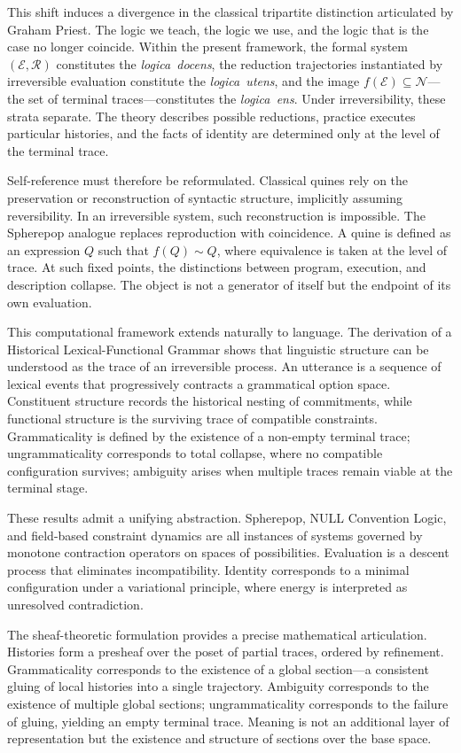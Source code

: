 \documentclass[12pt, oneside]{amsbook}
\theoremstyle{plain}
\theoremstyle{definition}
\theoremstyle{remark}
\newcommand{\Expr}{\mathcal{E}}
\newcommand{\NF}{\mathcal{N}}
\newcommand{\evalf}{f}
\newcommand{\tequiv}{\sim}
\newcommand{\ruleR}{\mathcal{R}}
\newcommand{\docens}{\textit{logica~docens}}
\newcommand{\utens}{\textit{logica~utens}}
\newcommand{\ens}{\textit{logica~ens}}
\begin{document}
This shift induces a divergence in the classical tripartite distinction
articulated by Graham Priest. The logic we teach, the logic we use, and the
logic that is the case no longer coincide. Within the present framework, the
formal system $(\Expr, \ruleR)$ constitutes the \docens{}, the reduction
trajectories instantiated by irreversible evaluation constitute the \utens{},
and the image $\evalf(\Expr) \subseteq \NF$---the set of terminal traces---constitutes
the \ens{}. Under irreversibility, these strata separate. The theory describes
possible reductions, practice executes particular histories, and the facts of
identity are determined only at the level of the terminal trace.

Self-reference must therefore be reformulated. Classical quines rely on the
preservation or reconstruction of syntactic structure, implicitly assuming
reversibility. In an irreversible system, such reconstruction is impossible.
The Spherepop analogue replaces reproduction with coincidence. A quine is
defined as an expression $Q$ such that $\evalf(Q) \tequiv Q$, where
equivalence is taken at the level of trace. At such fixed points, the
distinctions between program, execution, and description collapse. The object
is not a generator of itself but the endpoint of its own evaluation.

This computational framework extends naturally to language. The derivation of
a Historical Lexical-Functional Grammar shows that linguistic structure can be
understood as the trace of an irreversible process. An utterance is a sequence
of lexical events that progressively contracts a grammatical option space.
Constituent structure records the historical nesting of commitments, while
functional structure is the surviving trace of compatible constraints.
Grammaticality is defined by the existence of a non-empty terminal trace;
ungrammaticality corresponds to total collapse, where no compatible
configuration survives; ambiguity arises when multiple traces remain viable
at the terminal stage.

These results admit a unifying abstraction. Spherepop, NULL Convention Logic,
and field-based constraint dynamics are all instances of systems governed by
monotone contraction operators on spaces of possibilities. Evaluation is a
descent process that eliminates incompatibility. Identity corresponds to a
minimal configuration under a variational principle, where energy is interpreted
as unresolved contradiction.

The sheaf-theoretic formulation provides a precise mathematical articulation.
Histories form a presheaf over the poset of partial traces, ordered by
refinement. Grammaticality corresponds to the existence of a global section---a
consistent gluing of local histories into a single trajectory. Ambiguity
corresponds to the existence of multiple global sections; ungrammaticality
corresponds to the failure of gluing, yielding an empty terminal trace. Meaning
is not an additional layer of representation but the existence and structure of
sections over the base space.
\end{document}
